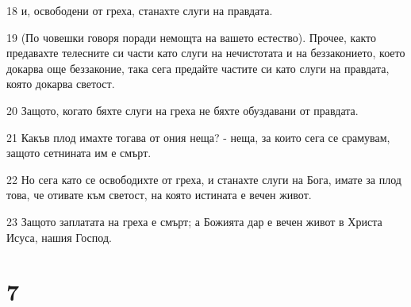 \par 18 и, освободени от греха, станахте слуги на правдата.
\par 19 (По човешки говоря поради немощта на вашето естество). Прочее, както предавахте телесните си части като слуги на нечистотата и на беззаконието, което докарва още беззаконие, така сега предайте частите си като слуги на правдата, която докарва светост.
\par 20 Защото, когато бяхте слуги на греха не бяхте обуздавани от правдата.
\par 21 Какъв плод имахте тогава от ония неща? - неща, за които сега се срамувам, защото сетнината им е смърт.
\par 22 Но сега като се освободихте от греха, и станахте слуги на Бога, имате за плод това, че отивате към светост, на която истината е вечен живот.
\par 23 Защото заплатата на греха е смърт; а Божията дар е вечен живот в Христа Исуса, нашия Господ.

\chapter{7}


